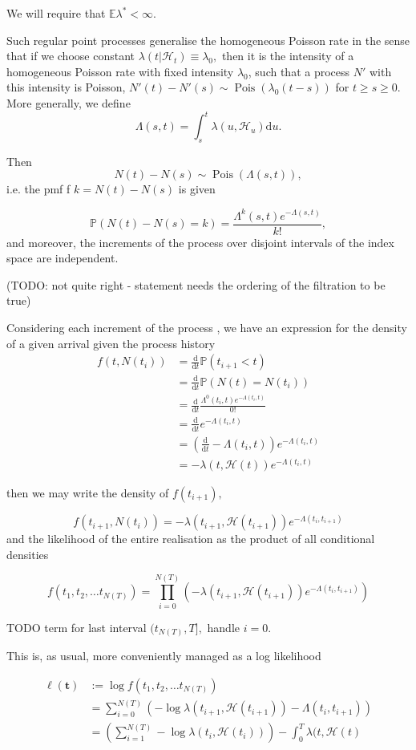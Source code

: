\documentclass[11pt]{article}
\newcommand{\dd}{\mathrm{d}}
\newcommand{\bb}[1]{\mathbb{#1}}
\renewcommand{\v}[1]{\boldsymbol{#1}}
\newcommand{\cc}[1]{\mathcal{#1}}
\renewcommand{\cc}[1]{\mathcal{#1}}
\newcommand{\oo}[1]{\operatorname{#1}}
\begin{document}
We will require that \(\bb E\lambda^*<\infty.\)

Such regular point processes generalise the homogeneous Poisson rate in
the sense that if we choose constant
\(\lambda(t|\cc{H}_t)\equiv \lambda_0,\) then it is the intensity of a
homogeneous Poisson rate with fixed intensity \(\lambda_0\), such that a
process \(N'\) with this intensity is Poisson,
\(N'(t)-N'(s)\sim\oo{Pois}(\lambda_0(t-s))\) for \(t\geq s \geq 0\).
More generally, we define \[
\Lambda(s,t) = \int_s^t\lambda(u,\cc{H}_u) \dd u.
\]

Then \[N(t)-N(s)\sim\oo{Pois}(\Lambda(s,t)),\] i.e. the pmf f
\(k=N(t)-N(s)\) is given

\[\bb P(N(t)-N(s)=k)=\frac {\Lambda^k(s,t)e^{-\Lambda(s,t) }}{k!},\] and
moreover, the increments of the process over disjoint intervals of the
index space are independent.

(TODO: not quite right - statement needs the ordering of the filtration
to be true)

    Considering each increment of the process , we have an expression for
the density of a given arrival given the process history
\[\begin{aligned}
f(t, N(t_i)) &= \frac{\dd}{\dd t}\bb P(t_{i+1}<t) \\
&= \frac{\dd}{\dd t} \bb P(N(t)=N(t_{i}))  \\
&= \frac{\dd}{\dd t} \frac {\Lambda^0(t_i,t)e^{-\Lambda(t_i,t) }}{0!}\\
&= \frac{\dd}{\dd t} e^{-\Lambda(t_i,t)} \\
&= \left(\frac{\dd}{\dd t} -\Lambda(t_i,t)\right) e^{-\Lambda(t_i,t)} \\
&= -\lambda(t, \cc H(t)) e^{-\Lambda(t_i,t)} 
\end{aligned}\]

    then we may write the density of \(f(t_{i+1}),\)

\[
f(t_{i+1}, N(t_i)) = -\lambda(t_{i+1}, \cc H(t_{i+1})) e^{-\Lambda(t_i,t_{i+1})} 
\] and the likelihood of the entire realisation as the product of all
conditional densities

\[
f(t_1, t_2, \dots t_{N(T)}) = \prod_{i=0}^{N(T)} \left(-\lambda(t_{i+1}, \cc H(t_{i+1})) e^{-\Lambda(t_i,t_{i+1})} \right)
\]

TODO term for last interval \((t_{N(T)},T],\) handle \(i=0.\)

    This is, as usual, more conveniently managed as a log likelihood

\[\begin{aligned}
\ell(\v t) &:= \log f(t_1, t_2, \dots t_{N(T)})\\
& = \sum_{i=0}^{N(T)}\left( -\log \lambda(t_{i+1}, \cc H(t_{i+1})) -\Lambda(t_i,t_{i+1})\right)\\
&=  \left(\sum_{i=1}^{N(T)} -\log \lambda(t_{i}, \cc H(t_{i}))\right) -\int_0^T \lambda(t, \cc H(t)
\end{aligned}\]
\end{document}
